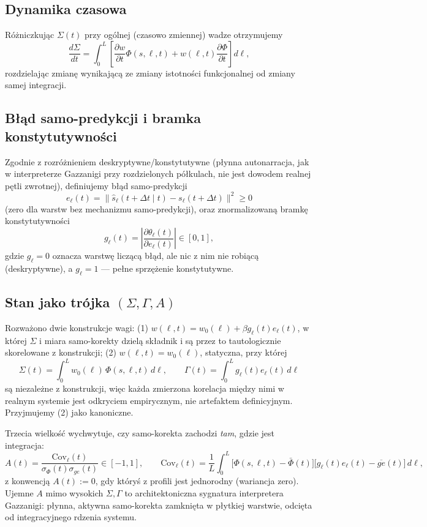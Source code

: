 \documentclass[11pt]{article}
\begin{document}
\subsection{Dynamika czasowa}
Różniczkując $\Sigma(t)$ przy ogólnej (czasowo zmiennej) wadze otrzymujemy
\[
\frac{d\Sigma}{dt} = \int_0^L \left[\frac{\partial w}{\partial t}\Phi(s,\ell,t) + w(\ell,t)\frac{\partial \Phi}{\partial t}\right]d\ell,
\]
rozdzielając zmianę wynikającą ze zmiany istotności funkcjonalnej od zmiany samej integracji.

\subsection{Błąd samo-predykcji i bramka konstytutywności}
Zgodnie z rozróżnieniem deskryptywne/konstytutywne (płynna autonarracja, jak w interpreterze Gazzanigi przy rozdzielonych półkulach, nie jest dowodem realnej pętli zwrotnej), definiujemy błąd samo-predykcji
\[
e_\ell(t) = \big\|\hat s_\ell(t+\Delta t\mid t) - s_\ell(t+\Delta t)\big\|^2 \ge 0
\]
(zero dla warstw bez mechanizmu samo-predykcji), oraz znormalizowaną bramkę konstytutywności
\[
g_\ell(t) = \left|\frac{\partial \theta_\ell(t)}{\partial e_\ell(t)}\right| \in [0,1],
\]
gdzie $g_\ell=0$ oznacza warstwę liczącą błąd, ale nic z nim nie robiącą (deskryptywne), a $g_\ell=1$ --- pełne sprzężenie konstytutywne.

\subsection{Stan jako trójka $(\Sigma,\Gamma,A)$}
Rozważono dwie konstrukcje wagi: (1) $w(\ell,t)=w_0(\ell)+\beta g_\ell(t)e_\ell(t)$, w której $\Sigma$ i miara samo-korekty dzielą składnik i są przez to tautologicznie skorelowane z konstrukcji; (2) $w(\ell,t)=w_0(\ell)$, statyczna, przy której
\[
\Sigma(t) = \int_0^L w_0(\ell)\,\Phi(s,\ell,t)\,d\ell, \qquad \Gamma(t) = \int_0^L g_\ell(t)e_\ell(t)\,d\ell
\]
są niezależne z konstrukcji, więc każda zmierzona korelacja między nimi w realnym systemie jest odkryciem empirycznym, nie artefaktem definicyjnym. Przyjmujemy (2) jako kanoniczne.

Trzecia wielkość wychwytuje, czy samo-korekta zachodzi \emph{tam}, gdzie jest integracja:
\[
A(t) = \frac{\mathrm{Cov}_\ell(t)}{\sigma_\Phi(t)\sigma_{ge}(t)} \in [-1,1], \qquad \mathrm{Cov}_\ell(t)=\frac{1}{L}\int_0^L\big[\Phi(s,\ell,t)-\bar\Phi(t)\big]\big[g_\ell(t)e_\ell(t)-\overline{ge}(t)\big]\,d\ell,
\]
z konwencją $A(t):=0$, gdy któryś z profili jest jednorodny (wariancja zero). Ujemne $A$ mimo wysokich $\Sigma,\Gamma$ to architektoniczna sygnatura interpretera Gazzanigi: płynna, aktywna samo-korekta zamknięta w płytkiej warstwie, odcięta od integracyjnego rdzenia systemu.
\end{document}
